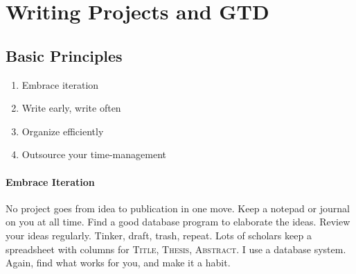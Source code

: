 \documentclass{tufte-handout}
\begin{document}





\section{Writing Projects and GTD}
\label{sec:write-proj-gtd}

\subsection{Basic Principles}
\label{basic-principles}

\begin{enumerate}

  \item Embrace iteration
  \item Write early, write often
  \item Organize efficiently
  \item Outsource your time-management

  \end{enumerate}

\paragraph{Embrace Iteration} No project goes from idea to publication
in one move. Keep a notepad or journal on you at all time. Find a good database program to elaborate the ideas. Review your ideas regularly. Tinker, draft, trash, repeat. Lots of scholars keep a spreadsheet with columns for \textsc{Title, Thesis, Abstract}. I use a database system. Again, find what works for you, and make it a habit. 
\end{document}

